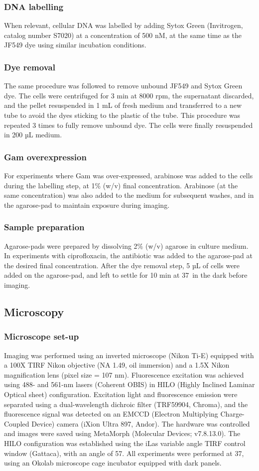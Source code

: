 \subsubsection*{DNA labelling}
When relevant, cellular DNA was labelled by adding Sytox Green (Invitrogen, catalog number S7020) at a concentration of 500 nM, at the same time as the JF549 dye using similar incubation conditions.
\subsubsection*{Dye removal}
The same procedure was followed to remove unbound JF549 and Sytox Green dye. The cells were centrifuged for 3 min at 8000 rpm, the supernatant discarded, and the pellet resuspended in 1 mL of fresh medium and transferred to a new tube to avoid the dyes sticking to the plastic of the tube. This procedure was repeated 3 times to fully remove unbound dye. The cells were finally resuspended in 200 µL medium.
\subsubsection*{Gam overexpression}
For experiments where Gam was over-expressed, arabinose was added to the cells during the labelling step, at 1\% (w/v) final concentration. Arabinose (at the same concentration) was also added to the medium for subsequent washes, and in the agarose-pad to maintain exposure during imaging.
\subsubsection*{Sample preparation}
Agarose-pads were prepared by dissolving 2\% (w/v) agarose in culture medium. In experiments with ciprofloxacin, the antibiotic was added to the agarose-pad at the desired final concentration. After the dye removal step, 5 µL of cells were added on the agarose-pad, and left to settle for 10 min at 37\celsius\ in the dark before imaging.

\subsection*{Microscopy}
\subsubsection*{Microscope set-up}
Imaging was performed using an inverted microscope (Nikon Ti-E) equipped with a 100X TIRF Nikon objective (NA 1.49, oil immersion) and a 1.5X Nikon magnification lens (pixel size = 107 nm). Fluorescence excitation was achieved using 488- and 561-nm lasers (Coherent OBIS) in HILO (Highly Inclined Laminar Optical sheet) configuration. Excitation light and fluorescence emission were separated using a dual-wavelength dichroic filter (TRF59904, Chroma), and the fluorescence signal was detected on an EMCCD (Electron Multiplying Charge-Coupled Device) camera (iXion Ultra 897, Andor). The hardware was controlled and images were saved using MetaMorph (Molecular Devices; v7.8.13.0). The HILO configuration was established using the iLas variable angle TIRF control window (Gattaca), with an angle of 57\degree. All experiments were performed at 37\celsius, using an Okolab microscope cage incubator equipped with dark panels.

